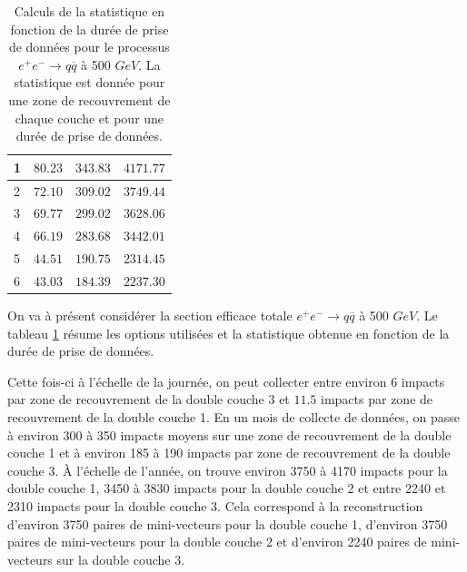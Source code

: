 \begin{table}[h]
\begin{tabular}{|l|l|l|l|}
1                                   & $80.23$                        & $343.83$                      & $4171.77$          \\ \hline
2                                   & $72.10$                        & $309.02$                      & $3749.44$          \\ \hline
3                                   & $69.77$                        & $299.02$                      & $3628.06$          \\ \hline
4                                   & $66.19$                        & $283.68$                      & $3442.01$          \\ \hline
5                                   & $44.51$                        & $190.75$                      & $2314.45$          \\ \hline
6                                   & $43.03$                        & $184.39$                      & $2237.30$          \\ \hline
\end{tabular}
\caption{Calculs de la statistique en fonction de la dur\'ee de prise de donn\'ees pour le processus $e^+ e^- \rightarrow q \overline{q} $ \`a 500 $GeV$. La statistique est donn\'ee pour une zone de recouvrement de chaque couche et pour une dur\'ee de prise de donn\'ees.}
\label{tab:sectTotZRStat}
\end{table}
  
  On va \`a pr\'esent consid\'erer la section efficace totale $e^+ e^- \rightarrow q \overline{q}$ \`a 500 $GeV$. Le tableau \ref{tab:sectTotZRStat} r\'esume les options utilis\'ees et la statistique obtenue en fonction de la dur\'ee de prise de donn\'ees.
 
 \medskip
 
 Cette fois-ci \`a l'\'echelle de la journ\'ee, on peut collecter entre environ $6$ impacts par zone de recouvrement de la double couche 3 et $11.5$ impacts par zone de recouvrement de la double couche 1. En un mois de collecte de donn\'ees, on passe \`a environ 300 \`a 350 impacts moyens sur une zone de recouvrement de la double couche 1 et \`a environ 185 \`a 190 impacts par zone de recouvrement de la double couche 3. \`A l'\'echelle de l'ann\'ee, on trouve environ 3750 \`a 4170 impacts pour la double couche 1, 3450 \`a 3830 impacts pour la double couche 2 et entre 2240 et 2310 impacts pour la double couche 3. Cela correspond \`a la reconstruction d'environ 3750 paires de mini-vecteurs pour la double couche 1, d'environ 3750 paires de mini-vecteurs pour la double couche 2 et d'environ 2240 paires de mini-vecteurs sur la double couche 3.
 
